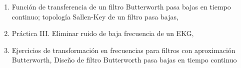 \begin{enumerate}
 \item Función de transferencia de un filtro Butterworth pasa bajas en tiempo continuo; topología Sallen-Key de un filtro pasa bajas, 
  \item Práctica III. Eliminar ruido de baja frecuencia de un EKG, 
  \item Ejercicios de transformación en frecuencias para filtros con aproximación Butterworth, Diseño de filtro Butterworth pasa bajas en tiempo continuo
\end{enumerate}